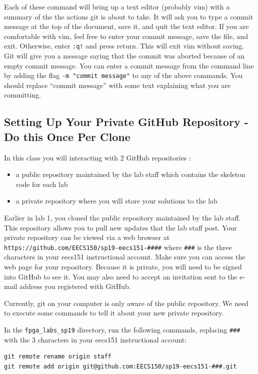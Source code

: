 \documentclass[11pt]{article}
\begin{document}
Each of these command will bring up a text editor (probably vim) with a summary of the the actions git is about to take.  It will ask you to type a commit message at the top of the document, save it, and quit the text editor.  If you are comfortable with vim, feel free to enter your commit message, save the file, and exit.  Otherwise, enter \verb|:q!| and press return.  This will exit vim without saving.  Git will give you a message saying that the commit was aborted because of an empty commit message.  You can enter a commit message from the command line by adding the flag \verb|-m "commit message"| to any of the above commands.  You should replace ``commit message'' with some text explaining what you are committing.

\subsection{Setting Up Your Private GitHub Repository - Do this Once Per Clone}
In this class you will interacting with 2 GitHub repositories :
\begin{itemize}
\item a public repository maintained by the lab staff which contains the skeleton code for each lab
\item a private repository where you will store your solutions to the lab 
\end{itemize}

Earlier in lab 1, you cloned the public repository maintained by the lab staff.  This repository allows you to pull new updates that the lab staff post.  Your private repository can be viewed via a web browser at \verb|https://github.com/EECS150/sp19-eecs151-####| where \verb|###| is the three characters in your eecs151 instructional account.  Make sure you can access the web page for your repository.  Because it is private, you will need to be signed into GitHub to see it.  You may also need to accept an invitation sent to the e-mail address you registered with GitHub.

Currently, git on your computer is only aware of the public repository.  We need to execute some commands to tell it about your new private repository.

In the \verb|fpga_labs_sp19| directory, run the following commands, replacing \verb|###| with the 3 characters in your eecs151 instructional account:
\begin{verbatim}
git remote rename origin staff
git remote add origin git@github.com:EECS150/sp19-eecs151-###.git
\end{verbatim}
\end{document}
